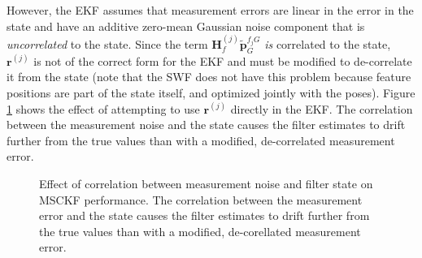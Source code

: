 \documentclass[letterpaper, 10 pt, conference]{ieeeconf}  %
\def\Vec#1{\mathbf{#1}}
\begin{document}
However, the EKF assumes that measurement errors are linear in the error in the state and have an additive zero-mean Gaussian noise component that is \textit{uncorrelated} to the state.
Since the term $\Vec{H}_{f}^{(j)} \widetilde{\Vec{p}}_G^{f_j G}$ \textit{is} correlated to the state, $\Vec{r}^{(j)}$ is not of the correct form for the EKF and must be modified to de-correlate it from the state (note that the SWF does not have this problem because feature positions are part of the state itself, and optimized jointly with the poses).
Figure \ref{fig:nullspace} shows the effect of attempting to use $\Vec{r}^{(j)}$ directly in the EKF.
The correlation between the measurement noise and the state causes the filter estimates to drift further from the true values than with a modified, de-correlated measurement error.

\begin{figure}
    \centering

    
    \caption{Effect of correlation between measurement noise and filter state on MSCKF performance. The correlation between the measurement error and the state causes the filter estimates to drift further from the true values than with a modified, de-corellated measurement error.}
    \label{fig:nullspace}
\end{figure}
\end{document}
